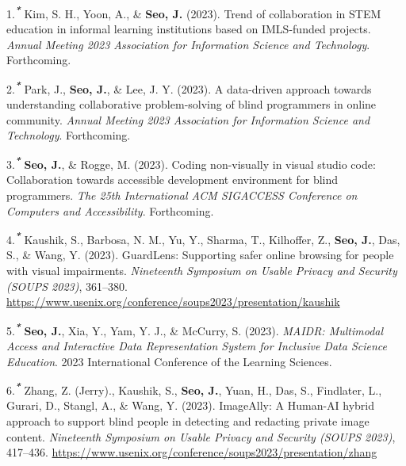 \documentclass[11pt,a4paper,]{awesome-cv}
\begin{document}
\hypertarget{bibliography}{}
\leavevmode{}%
1.\textsuperscript{\textbf{\emph{*}}} Kim, S. H., Yoon, A., \&
\textbf{Seo, J.} (2023). Trend of collaboration in STEM education in
informal learning institutions based on IMLS-funded projects.
\emph{Annual Meeting 2023 Association for Information Science and
Technology}. Forthcoming.

\leavevmode{}%
2.\textsuperscript{\textbf{\emph{*}}} Park, J., \textbf{Seo, J.}, \&
Lee, J. Y. (2023). A data-driven approach towards understanding
collaborative problem-solving of blind programmers in online community.
\emph{Annual Meeting 2023 Association for Information Science and
Technology}. Forthcoming.

\leavevmode{}%
3.\textsuperscript{\textbf{\emph{*}}} \textbf{Seo, J.}, \& Rogge, M.
(2023). Coding non-visually in visual studio code: Collaboration towards
accessible development environment for blind programmers. \emph{The 25th
International ACM SIGACCESS Conference on Computers and Accessibility}.
Forthcoming.

\leavevmode{}%
4.\textsuperscript{\textbf{\emph{*}}} Kaushik, S., Barbosa, N. M., Yu,
Y., Sharma, T., Kilhoffer, Z., \textbf{Seo, J.}, Das, S., \& Wang, Y.
(2023). GuardLens: Supporting safer online browsing for people with
visual impairments. \emph{Nineteenth Symposium on Usable Privacy and
Security (SOUPS 2023)}, 361--380.
\url{https://www.usenix.org/conference/soups2023/presentation/kaushik}

\leavevmode{}%
5.\textsuperscript{\textbf{\emph{*}}} \textbf{Seo, J.}, Xia, Y., Yam, Y.
J., \& McCurry, S. (2023). \emph{MAIDR: Multimodal Access and
Interactive Data Representation System for Inclusive Data Science
Education}. 2023 International Conference of the Learning Sciences.

\leavevmode{}%
6.\textsuperscript{\textbf{\emph{*}}} Zhang, Z. (Jerry)., Kaushik, S.,
\textbf{Seo, J.}, Yuan, H., Das, S., Findlater, L., Gurari, D., Stangl,
A., \& Wang, Y. (2023). ImageAlly: A Human-AI hybrid approach to support
blind people in detecting and redacting private image content.
\emph{Nineteenth Symposium on Usable Privacy and Security (SOUPS 2023)},
417--436.
\url{https://www.usenix.org/conference/soups2023/presentation/zhang}
\end{document}
